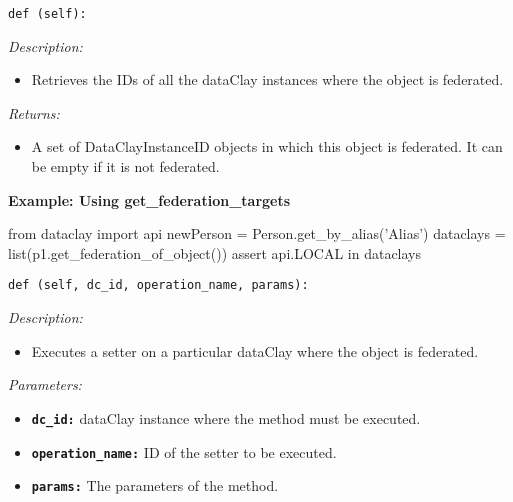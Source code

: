 
\begin{dBox}
\texttt{def (self):}
\LINE

{\it Description:}

\begin{itemize}
 \item Retrieves the IDs of all the dataClay instances where the object is federated. 
\end{itemize}

{\it Returns:}

\begin{itemize}
 \item A set of DataClayInstanceID objects in which this object is federated. 
 It can be empty if it is not federated.
\end{itemize}

\end{dBox}

\begin{tBox}
\textcolor{basecolor} {\bf Example: Using get\_federation\_targets}
\begin{python}
from dataclay import api
newPerson = Person.get_by_alias('Alias')
dataclays = list(p1.get_federation_of_object())
assert api.LOCAL in dataclays
\end{python}
\end{tBox}


\begin{dBox}
\texttt{def (self, dc\_id, operation\_name, params):}
\LINE

{\it Description:}

\begin{itemize}
  \item Executes a setter on a particular dataClay where the object is federated.
\end{itemize}

{\it Parameters:}

\begin{itemize}
  \item \texttt{\bfseries dc\_id:} dataClay instance where the method must be executed.
  \item \texttt{\bfseries operation\_name:} ID of the setter to be executed.
  \item \texttt{\bfseries params:} The parameters of the method.
\end{itemize}
 
\end{dBox}

